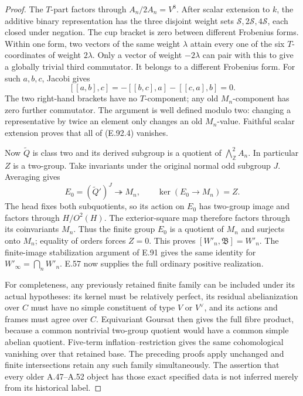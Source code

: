 \begin{proof}
The \(T\)-part factors through \(A_n/2A_n=V^8\).
After scalar extension to \(k\), the additive binary representation
has the three disjoint weight sets
\(\mathcal S,2\mathcal S,4\mathcal S\), each closed under negation.
The cup bracket is zero between different Frobenius forms.
Within one form, two vectors of the same weight \(\lambda\)
attain every one of the six \(T\)-coordinates of weight \(2\lambda\).
Only a vector of weight \(-2\lambda\) can pair with this
to give a globally trivial third commutator.
It belongs to a different Frobenius form.
For such \(a,b,c\), Jacobi gives
\[
 [[a,b],c]=-[[b,c],a]-[[c,a],b]=0.                        \tag{E.92.5}
\]
The two right-hand brackets have no \(T\)-component;
any old \(M_n\)-component has zero further commutator.
The argument is well defined modulo two: changing a representative
by twice an element only changes an old \(M_n\)-value.
Faithful scalar extension proves that all of (E.92.4) vanishes.

Now \(\widetilde Q\) is class two and its derived subgroup
is a quotient of \(\bigwedge^2_{\mathbb Z}A_n\).
In particular \(Z\) is a two-group.
Take invariants under the original normal odd subgroup \(J\).
Averaging gives
\[
 E_0=(\widetilde Q')^J\twoheadrightarrow M_n,\qquad
 \ker(E_0\to M_n)=Z.                                    \tag{E.92.6}
\]
The head fixes both subquotients, so its action on \(E_0\)
has two-group image and factors through \(H/O^2(H)\).
The exterior-square map therefore factors through its
coinvariants \(M_n\).
Thus the finite group \(E_0\) is a quotient of \(M_n\)
and surjects onto \(M_n\); equality of orders forces \(Z=0\).
This proves \([W'_n,\mathfrak B]=W'_n\).
The finite-image stabilization argument of E.91 gives the same
identity for \(W'_\infty=\bigcap_nW'_n\).
E.57 now supplies the full ordinary positive realization.

For completeness, any previously retained finite family can be
included under its actual hypotheses: its kernel must be relatively
perfect, its residual abelianization over \(C\) must have no
simple constituent of type \(V\) or \(V^\vee\), and its actions
and frames must agree over \(C\).
Equivariant Goursat then gives the full fibre product, because
a common nontrivial two-group quotient would have a common simple
abelian quotient.  Five-term inflation--restriction gives the same
cohomological vanishing over that retained base.
The preceding proofs apply unchanged and finite intersections
retain any such family simultaneously.
The assertion that every older A.47--A.52 object has those exact
specified data is not inferred merely from its historical label.


\end{proof}
